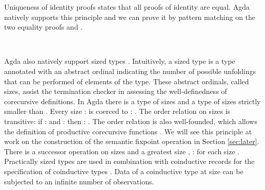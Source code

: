 Uniqueness of identity proofs states that all proofs of identity are
equal. Agda natively supports this principle and we can prove it by
pattern matching on the two equality proofs  and .
\begin{code}%
\>[0]\AgdaSpace{}%
\AgdaSymbol{:}\AgdaSpace{}%
\AgdaSymbol{\{}\AgdaSpace{}%
\AgdaSymbol{:}\AgdaSpace{}%
\AgdaSymbol{\}}\AgdaSpace{}%
\AgdaSymbol{\{}\AgdaSpace{}%
\AgdaSpace{}%
\AgdaSymbol{:}\AgdaSpace{}%
\AgdaSymbol{\}}\AgdaSpace{}%
\AgdaSymbol{\{}\AgdaSpace{}%
\AgdaSpace{}%
\AgdaSymbol{:}\AgdaSpace{}%
\AgdaSpace{}%
\AgdaSpace{}%
\AgdaSymbol{\}}\AgdaSpace{}%
\AgdaSpace{}%
\AgdaSpace{}%
\AgdaSpace{}%
\<%
\\
\>[0]\AgdaSpace{}%
\AgdaSymbol{\{}\AgdaSymbol{\}}\AgdaSpace{}%
\AgdaSymbol{\{}\AgdaSymbol{\}}\AgdaSpace{}%
\AgdaSymbol{\{}\AgdaSymbol{\}}\AgdaSpace{}%
\AgdaSymbol{\{}\AgdaSymbol{\}}\AgdaSpace{}%
\AgdaSymbol{\{}\AgdaSymbol{\}}\AgdaSpace{}%
\AgdaSymbol{=}\AgdaSpace{}%
\<%
\end{code}

Agda also natively support sized types
\cite{A-sized,AVW-normalization}. Intuitively, a sized type is a type
annotated with an abstract ordinal indicating the number of possible
unfoldings that can be performed of elements of the type.  These
abstract ordinals, called sizes, assist the termination checker in
assessing the well-definedness of corecursive definitions.
In Agda there is a type  of sizes and a type 
 of sizes strictly smaller than .  Every size  :
  is coerced to  : . The order relation
on sizes is transitive: if  :   and  :
  then  :  .
The order relation is also well-founded, which allows the definition of productive corecursive functions \cite{A-sized}. We will see this principle at work on the construction of the semantic fixpoint operation in Section \ref{sec:later}.
There is a successor operation  on sizes and a greatest size
, \ie {} :   for each size . Practically
sized types are used in combination with coinductive records for the
specification of coinductive types . Data of a
coinductive type at size  can be subjected to an infinite number
of observations.

